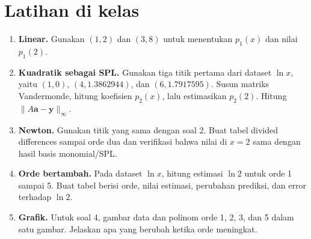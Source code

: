 \section{Latihan di kelas}
\begin{enumerate}
\item \textbf{Linear.} Gunakan $(1,2)$ dan $(3,8)$ untuk menentukan $p_1(x)$ dan nilai $p_1(2)$.

\item \textbf{Kuadratik sebagai SPL.} Gunakan tiga titik pertama dari dataset $\ln x$, yaitu $(1,0)$, $(4,1.3862944)$, dan $(6,1.7917595)$. Susun matriks Vandermonde, hitung koefisien $p_2(x)$, lalu estimasikan $p_2(2)$. Hitung $\|A\mathbf a-\mathbf y\|_\infty$.

\item \textbf{Newton.} Gunakan titik yang sama dengan soal 2. Buat tabel divided differences sampai orde dua dan verifikasi bahwa nilai di $x=2$ sama dengan hasil basis monomial/SPL.

\item \textbf{Orde bertambah.} Pada dataset $\ln x$, hitung estimasi $\ln 2$ untuk orde 1 sampai 5. Buat tabel berisi orde, nilai estimasi, perubahan prediksi, dan error terhadap $\ln 2$.

\item \textbf{Grafik.} Untuk soal 4, gambar data dan polinom orde 1, 2, 3, dan 5 dalam satu gambar. Jelaskan apa yang berubah ketika orde meningkat.
\end{enumerate}

